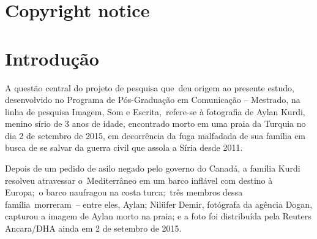 \documentclass[
  letterpaper,
  a4paper,
  12pt]{scrbook}
\begin{document}
\hypertarget{copyright-notice}{%
\chapter*{Copyright notice}\label{copyright-notice}}



\hypertarget{introduuxe7uxe3o}{%
\chapter{Introdução}\label{introduuxe7uxe3o}}

A questão central do projeto de pesquisa que~deu origem ao presente
estudo, desenvolvido no Programa de Pós-Graduação em Comunicação --
Mestrado, na linha de pesquisa Imagem, Som e Escrita,~refere-se à
fotografia de Aylan Kurdi, menino sírio de 3 anos de idade, encontrado
morto em uma praia da Turquia no dia 2 de setembro de 2015, em
decorrência da fuga malfadada de sua família em busca de se salvar da
guerra civil que assola a Síria desde 2011.~

Depois de um pedido de asilo negado pelo governo do Canadá, a família
Kurdi resolveu atravessar o~Mediterrâneo em um barco inflável com
destino à Europa;~o barco naufragou na costa turca;~três membros dessa
família~morreram~-- entre eles, Aylan; Nilüfer Demir, fotógrafa da
agência Dogan, capturou a imagem de Aylan morto na praia; e a foto foi
distribuída pela Reuters Ancara/DHA ainda em 2 de setembro de 2015.
\end{document}
